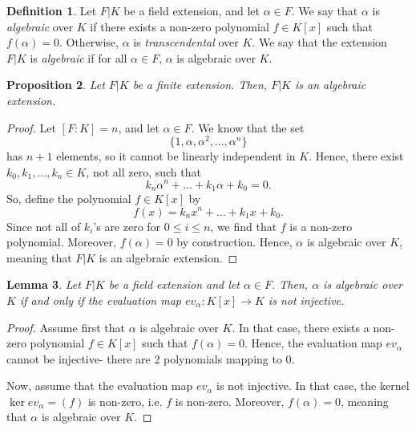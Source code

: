 \documentclass[a4paper, openany]{memoir}
\theoremstyle{definition}
\newtheorem{definition}{Definition}[section]
\theoremstyle{plain}
\newtheorem{lemma}[definition]{Lemma}
\newtheorem{proposition}[definition]{Proposition}
\begin{document}
    \begin{definition}
        Let $F|K$ be a field extension, and let $\alpha \in F$. We say that $\alpha$ is \emph{algebraic} over $K$ if there exists a non-zero polynomial $f \in K[x]$ such that $f(\alpha) = 0$. Otherwise, $\alpha$ is \emph{transcendental} over $K$. We say that the extension $F|K$ is \emph{algebraic} if for all $\alpha \in F$, $\alpha$ is algebraic over $K$.
    \end{definition}

    \begin{proposition}
        Let $F|K$ be a finite extension. Then, $F|K$ is an algebraic extension.
    \end{proposition}
    \begin{proof}
        Let $[F:K] = n$, and let $\alpha \in F$. We know that the set
        \[\{1, \alpha, \alpha^2, \dots, \alpha^n\}\]
        has $n+1$ elements, so it cannot be linearly independent in $K$. Hence, there exist $k_0, k_1, \dots, k_n \in K$, not all zero, such that
        \[k_n \alpha^n + \dots + k_1 \alpha + k_0 = 0.\]
        So, define the polynomial $f \in K[x]$ by
        \[f(x) = k_n x^n + \dots + k_1 x + k_0.\]
        Since not all of $k_i$'s are zero for $0 \leq i \leq n$, we find that $f$ is a non-zero polynomial. Moreover, $f(\alpha) = 0$ by construction. Hence, $\alpha$ is algebraic over $K$, meaning that $F|K$ is an algebraic extension.
    \end{proof}

    \begin{lemma}
        Let $F|K$ be a field extension and let $\alpha \in F$. Then, $\alpha$ is algebraic over $K$ if and only if the evaluation map $ev_\alpha \colon K[x] \to K$ is not injective.
    \end{lemma}
    \begin{proof}
        Assume first that $\alpha$ is algebraic over $K$. In that case, there exists a non-zero polynomial $f \in K[x]$ such that $f(\alpha) = 0$. Hence, the evaluation map $ev_\alpha$ cannot be injective- there are 2 polynomials mapping to $0$.

        Now, assume that the evaluation map $ev_\alpha$ is not injective. In that case, the kernel $\ker ev_\alpha = (f)$ is non-zero, i.e. $f$ is non-zero. Moreover, $f(\alpha) = 0$, meaning that $\alpha$ is algebraic over $K$.
    \end{proof}
\end{document}
